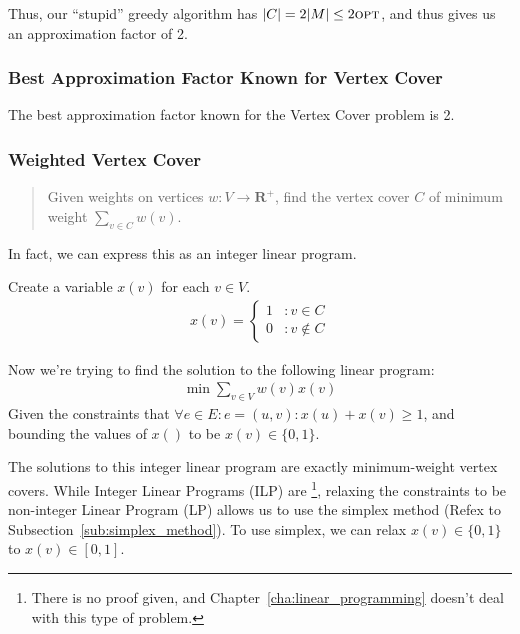                     Thus, our ``stupid'' greedy algorithm has $|C| = 2|M| \le 2 \textsc{opt}$, and thus gives us an approximation factor of 2.
                    \subsubsection{Best Approximation Factor Known for Vertex Cover} %
                    \label{ssub:best_approximation_factor_known_for_vertex_cover}
                        The best approximation factor known for the Vertex Cover problem is 2.
                \subsubsection{Weighted Vertex Cover} %
                \label{ssub:weighted_vertex_cover}
                    \begin{quotation}
                        Given weights on vertices $w : V \to \mathbf{R}^+$, find the vertex cover $C$ of minimum weight $\sum_{v \in C} w(v)$.
                    \end{quotation}
                    In fact, we can express this as an integer linear program.

                    Create a variable $x(v)$ for each $v \in V$.
                    \begin{align*}
                        x(v) = \left\{
                            \begin{array}{lr}
                                1 & : v \in C \\
                                0 & : v \notin C
                            \end{array}
                        \right.
                    \end{align*}

                    Now we're trying to find the solution to the following linear program:
                    \begin{align*}
                        \min \sum_{v \in V} w(v) x(v)
                    \end{align*}
                    Given the constraints that $\forall e \in E : e = (u, v) : x(u) + x(v) \ge 1$, and bounding the values of $x()$ to be $x(v) \in \{0, 1\}$.

                    The solutions to this integer linear program are exactly minimum-weight vertex covers.
                    While Integer Linear Programs (\textsc{ILP}) are \npcomplete\footnote{There is no proof given, and Chapter~\ref{cha:linear_programming} doesn't deal with this type of problem.}, relaxing the constraints to be non-integer Linear Program (\textsc{LP}) allows us to use the simplex method (Refex to Subsection~\ref{sub:simplex_method}).
                    To use simplex, we can relax $x(v) \in \{0, 1\}$ to $x(v) \in [0, 1]$.

